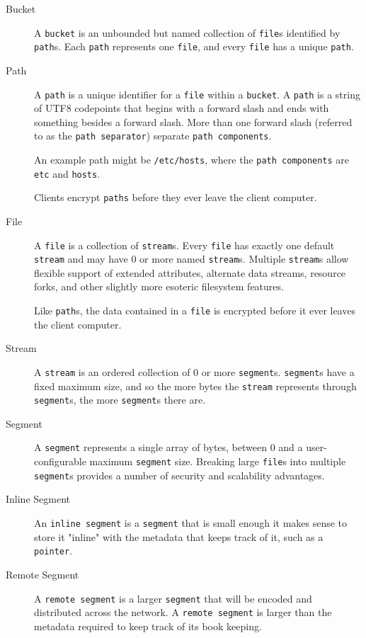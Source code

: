 \documentclass[a4paper,10pt]{article}
\newcommand{\x}[1]{{\tt #1}}
\newcommand{\code}[1]{{\tt #1}}
\begin{document}
\begin{description}
\item[Bucket] A \x{bucket} is an unbounded but named collection of
\x{file}s identified by \x{path}s. Each \x{path} represents one
\x{file}, and every \x{file} has a unique \x{path}.

\item[Path] A \x{path} is a unique identifier for a \x{file} within a
\x{bucket}. A \x{path} is a string of UTF8 codepoints that begins with a forward
slash and ends with something besides a forward slash. More than one forward
slash (referred to as the \x{path separator}) separate \x{path components}.

An example path might be \code{/etc/hosts}, where the \x{path components} are
\code{etc} and \code{hosts}.

Clients encrypt \x{paths} before they ever leave the client computer.

\item[File] A \x{file} is a collection of \x{stream}s. Every \x{file} has
exactly one default \x{stream} and may have 0 or more named \x{stream}s.
Multiple \x{stream}s allow flexible support of extended attributes, alternate
data streams, resource forks, and other slightly more esoteric filesystem
features.

Like \x{path}s, the data contained in a \x{file} is encrypted before it ever
leaves the client computer.

\item[Stream] A \x{stream} is an ordered collection of 0 or more \x{segment}s.
\x{segment}s have a fixed maximum size, and so the more bytes the \x{stream}
represents through \x{segment}s, the more \x{segment}s there are.

\item[Segment] A \x{segment} represents a single array of bytes, between 0 and a
user-configurable maximum \x{segment} size. Breaking large \x{file}s into
multiple \x{segment}s provides a number of security and scalability advantages.

\item[Inline Segment] An \x{inline segment} is a \x{segment} that is small
enough it makes sense to store it "inline" with the metadata that keeps track of
it, such as a \x{pointer}.

\item[Remote Segment] A \x{remote segment} is a larger \x{segment} that will be
encoded and distributed across the network. A \x{remote segment} is larger than
the metadata required to keep track of its book keeping.


\end{description}
\end{document}
